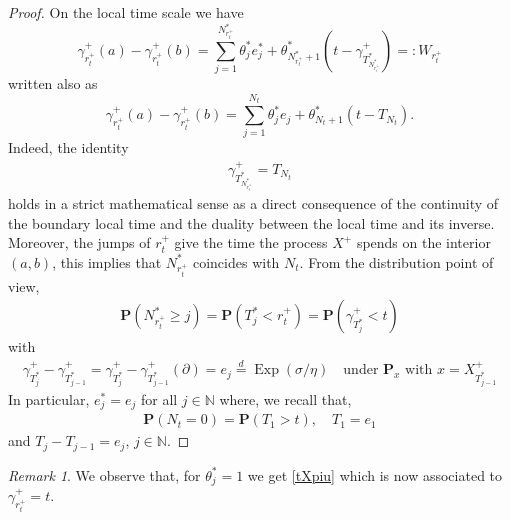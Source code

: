 \documentclass[10pt,a4paper]{article}
\numberwithin{equation}{section}
\theoremstyle{plain}
\theoremstyle{remark}
\newtheorem{remark}{Remark}
\begin{document}
\begin{proof}
On the local time scale we have
\begin{equation}
\gamma^+_{r^+_t}(a) - \gamma^+_{r^+_t}(b) = \sum_{j=1}^{N^*_{r^+_t}} \theta^*_j e^*_j + \theta^*_{N^*_{r^+_t} + 1} \left( t - \gamma^+_{T^*_{N^*_{r^+_t}}} \right)=: W_{r^+_t}
\end{equation}
written also as
\begin{equation}
\gamma^+_{r^+_t}(a) - \gamma^+_{r^+_t}(b) = \sum_{j=1}^{N_t} \theta^*_j e_j + \theta^*_{N_t + 1} \left( t - T_{N_t} \right).
\label{DidLTscale}
\end{equation}
Indeed, the identity 
\begin{align*}
\gamma^+_{T^*_{N^*_{r^+_t}}} = T_{N_t}
\end{align*}
holds in a strict mathematical sense as a direct consequence of the continuity of the boundary local time and the duality between the local time and its inverse. Moreover, the jumps of $r^+_t$ give the time the process $X^+$ spends on the interior $(a,b)$, this implies that $N^*_{r^+_t}$ coincides with $N_t$. From the distribution point of view,
\begin{align*}
\mathbf{P}(N^*_{r^+_t} \geq j) = \mathbf{P}(T^*_j < r^+_t) = \mathbf{P}(\gamma^+_{T^*_j} < t)
\end{align*}
with 
\begin{align*}
\gamma^+_{T^*_j} - \gamma^+_{T^*_{j-1}} = \gamma^+_{T^*_j} - \gamma^+_{T^*_{j-1}} (\partial) = e_j \stackrel{d}{=} \operatorname{Exp}(\sigma/\eta) \quad \textrm{under $\mathbf{P}_x$ with $x=X^+_{T^*_{j-1}}$}
\end{align*}
In particular, $e^*_j=e_j$ for all $j \in \mathbb{N}$ where, we recall that,  
\begin{align*}
\mathbf{P}(N_t=0) = \mathbf{P}(T_1 >t), \quad T_1 = e_1
\end{align*}
and $T_j - T_{j-1}=e_j$, $j \in \mathbb{N}$.

\end{proof}


\begin{remark}
We observe that, for $\theta^*_j=1$ we get \eqref{tXpiu} which is now associated to $\gamma^+_{r^+_t} =t$.
\end{remark}
\end{document}
